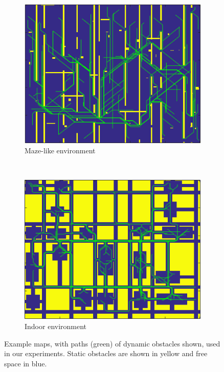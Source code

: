 \begin{figure}[ht]
  \centering
  \begin{subfigure}[t]{0.45\linewidth}
    \centering
    \includegraphics[width=\linewidth]{Figures/dyn.png}
    \caption{Maze-like environment}
  \end{subfigure}
  ~
  \begin{subfigure}[t]{0.45\linewidth}
    \centering
    \includegraphics[width=\linewidth]{Figures/indoor.png}
    \caption{Indoor environment}
  \end{subfigure}
  \caption{Example maps, with paths (green) of dynamic obstacles shown, used in our experiments. Static obstacles are shown in yellow and free space in blue.}
  \label{fig:ppad-env}
\end{figure}
 
